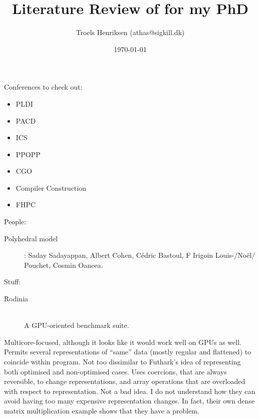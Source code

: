 \documentclass[a4paper, oneside, final]{memoir}
\title{Literature Review of for my PhD}
\author{Troels Henriksen (athas@sigkill.dk)}
\date{\today}
\begin{document}
\frontmatter

\maketitle
\thispagestyle{empty}

Conferences to check out:

\begin{itemize}
\item PLDI
\item PACD
\item ICS
\item PPOPP
\item CGO
\item Compiler Construction
\item FHPC
\end{itemize}

People:

\begin{description}
\item[Polyhedral model]: Saday Sadayappan, Albert Cohen, Cédric
  Bastoul, F Irigoin Louis-/Noël/ Pouchet, Cosmin Oancea.
\end{description}

Stuff:

\begin{description}
\item[Rodinia]\hfill\\ A GPU-oriented benchmark suite.
\end{description}

\begin{quote}
\end{quote}

Multicore-focused, although it looks like it would work well on GPUs
as well.  Permits several representations of ``same'' data (mostly
regular and flattened) to coincide within program.  Not too dissimilar
to Futhark's idea of representing both optimised and non-optimised
cases.  Uses coercions, that are always reversible, to change
representations, and array operations that are overloaded with respect
to representation.  Not a bad idea.  I do not understand how they can
avoid having too many expensive representation changes.  In fact,
their own dense matrix multiplication example shows that they have a
problem.

\begin{quote}
\end{quote}
\end{document}
